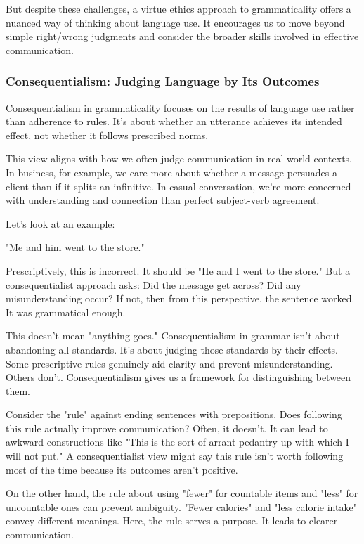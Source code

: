But despite these challenges, a virtue ethics approach to grammaticality offers a nuanced way of thinking about language use. It encourages us to move beyond simple right/wrong judgments and consider the broader skills involved in effective communication.

\subsubsection{Consequentialism: Judging Language by Its Outcomes}

Consequentialism in grammaticality focuses on the results of language use rather than adherence to rules. It's about whether an utterance achieves its intended effect, not whether it follows prescribed norms.

This view aligns with how we often judge communication in real-world contexts. In business, for example, we care more about whether a message persuades a client than if it splits an infinitive. In casual conversation, we're more concerned with understanding and connection than perfect subject-verb agreement.

Let's look at an example:

"Me and him went to the store."

Prescriptively, this is incorrect. It should be "He and I went to the store." But a consequentialist approach asks: Did the message get across? Did any misunderstanding occur? If not, then from this perspective, the sentence worked. It was grammatical enough.

This doesn't mean "anything goes." Consequentialism in grammar isn't about abandoning all standards. It's about judging those standards by their effects. Some prescriptive rules genuinely aid clarity and prevent misunderstanding. Others don't. Consequentialism gives us a framework for distinguishing between them.

Consider the "rule" against ending sentences with prepositions. Does following this rule actually improve communication? Often, it doesn't. It can lead to awkward constructions like "This is the sort of arrant pedantry up with which I will not put." A consequentialist view might say this rule isn't worth following most of the time because its outcomes aren't positive.

On the other hand, the rule about using "fewer" for countable items and "less" for uncountable ones can prevent ambiguity. "Fewer calories" and "less calorie intake" convey different meanings. Here, the rule serves a purpose. It leads to clearer communication.

